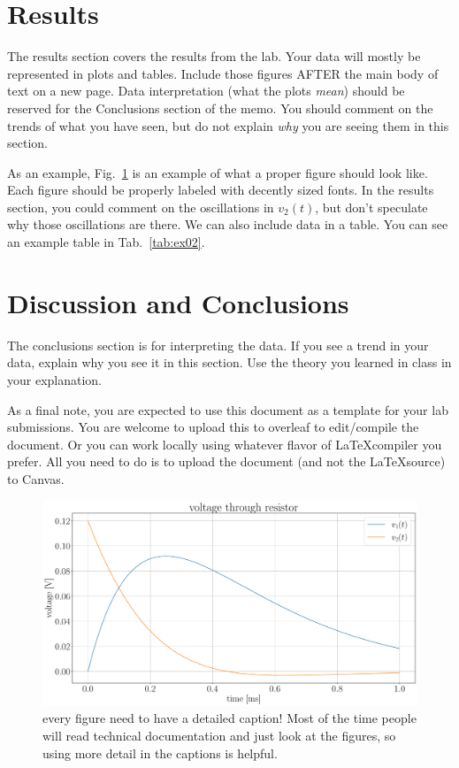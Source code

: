 \documentclass[11pt]{texMemo-gibbons}
\begin{document}
\section{Results}
\label{sec:results}

The results section covers the results from the lab.  Your data will mostly be represented in plots and tables.  Include those figures AFTER the main body of text on a new page.  Data interpretation (what the plots \emph{mean}) should be reserved for the Conclusions section of the memo.  You should comment on the trends of what you have seen, but do not explain \emph{why} you are seeing them in this section.

As an example, Fig.~\ref{fig:ex01} is an example of what a proper figure should look like.  Each figure should be properly labeled with decently sized fonts.   In the results section, you could comment  on the oscillations in $v_2(t)$, but don't speculate why those oscillations are there.  We can also include data in a table.  You can see an example table in Tab.~\ref{tab:ex02}.  

\section{Discussion and Conclusions}
\label{sec:conclusions}

The conclusions section is for interpreting the data.  If you see a trend in your data, explain why you see it in this section.  Use the theory you learned in class in your explanation.

As a final note, you are expected to use this document as a template for your lab submissions.  You are welcome to upload this to overleaf to edit/compile the document.  Or you can work locally using whatever flavor of \LaTeX  compiler you prefer.  All you need to do is to upload the document (and not the \LaTeX  source) to Canvas.  

\clearpage

\begin{figure}[h!]
  \centering
  \includegraphics[width=0.7\linewidth]{fig_ex.pdf}
  \caption{every figure need to have a detailed caption!  Most of the time people will read technical documentation and just look at the figures, so using more detail in the captions is helpful.}
  \label{fig:ex01}
\end{figure}
\end{document}
